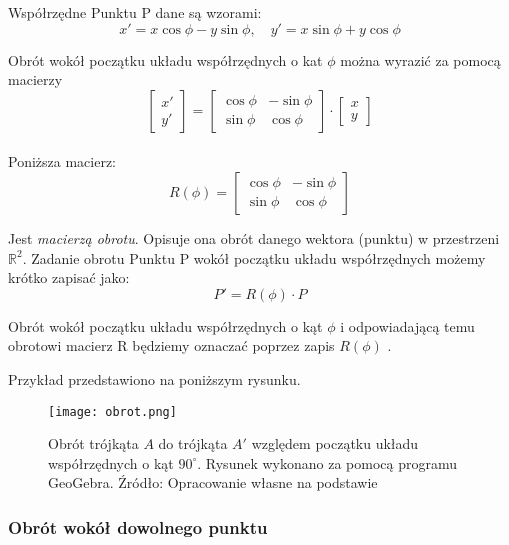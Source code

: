Współrzędne Punktu P dane są wzorami:
\begin{equation}
    x' = x\cos\phi - y\sin\phi, \quad y' = x\sin\phi + y\cos\phi
\end{equation}

Obrót wokół początku układu współrzędnych o kat $\phi$ można wyrazić za pomocą macierzy
\begin{equation*}
    \begin{bmatrix}
    x' \\
    y'
    \end{bmatrix}
    = 
    \begin{bmatrix}
    \cos\phi & -\sin\phi \\
    \sin\phi & \cos\phi
    \end{bmatrix}
    \cdot
    \begin{bmatrix}
    x \\
    y
    \end{bmatrix}
\end{equation*}
\\
Poniższa macierz:
\begin{equation*}
    R(\phi) = 
    \begin{bmatrix}
    \cos\phi &  -\sin\phi \\
    \sin\phi & \cos\phi
    \end{bmatrix}
\end{equation*}

Jest \textit{macierzą obrotu}. Opisuje ona  obrót danego wektora (punktu) w przestrzeni $\mathbb{R}^{2}$.
Zadanie obrotu Punktu P wokół początku układu współrzędnych możemy krótko zapisać jako:
\begin{equation*}
    P' = R(\phi) \cdot P
\end{equation*}

Obrót wokół początku układu współrzędnych o kąt $\phi$ i odpowiadającą temu obrotowi macierz R będziemy oznaczać poprzez zapis $R(\phi)$ \citep[s. 6-7]{Badura2005}.

Przykład przedstawiono na poniższym rysunku.

\begin{figure}[H]
\texttt{[image: obrot.png]}
\caption{Obrót trójkąta $A$ do trójkąta $A'$ względem początku układu współrzędnych o kąt $90^{\circ}$. Rysunek wykonano za pomocą programu GeoGebra. Źródło: Opracowanie własne na podstawie \citep[s. 6-7]{Badura2005}} 
\centering
\end{figure}


\subsubsection{Obrót wokół dowolnego punktu}


